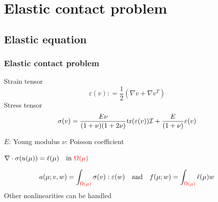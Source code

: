 \documentclass[a4paper,10pt]{beamer}
\newcommand\red[1]{\textcolor{red} {#1} }
\begin{document}
\section{Elastic contact problem}
\subsection{Elastic equation}
\begin{frame}\frametitle{Elastic contact problem}
Strain tensor
$$
 \varepsilon(v): = \frac{1}{2}(\nabla v + \nabla v^T)
$$
Stress tensor
$$
\sigma(v) = \frac{E\nu}{(1+\nu)(1+2\nu)} {\rm tr}(\varepsilon(v))\mathcal I+\frac{E}{(1+\nu)}\varepsilon(v)
$$
\begin{center}
$E$: Young modulus
\qquad
$\nu$: Poisson coefficient
\smallskip 

\begin{tcolorbox}[colback=blue!5,colframe=black!50!cyan,width = .7\linewidth,title={Parametric equilibrium condition}, halign = center]
$\nabla\cdot\sigma(u(\mu)) = \ell(\mu) \quad \text{in } \red{\Omega(\mu)}
$
\end{tcolorbox}
\end{center}
$$ a(\mu;v,w) = \int_{\red{\Omega(\mu)}}\sigma(v):\varepsilon(w)
\quad\text{and}\quad
 f(\mu;w) = \int_{\red{\Omega(\mu)}}\ell(\mu)w
$$
Other nonlinearities can be handled
\end{frame}
\end{document}
